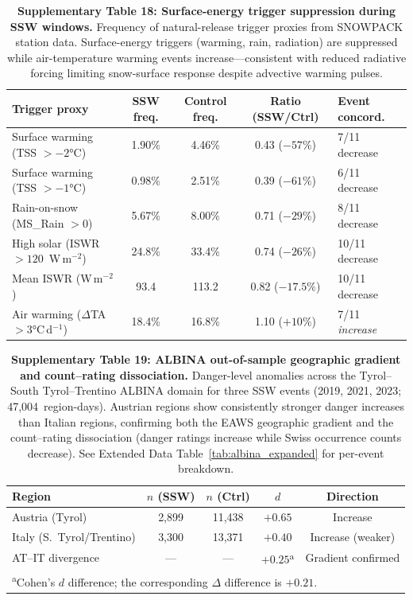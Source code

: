 \documentclass[11pt,letterpaper]{article}
\begin{document}
\begin{table}[!ht]
\centering
\caption{\textbf{Supplementary Table 18: Surface-energy trigger suppression during SSW windows.}
Frequency of natural-release trigger proxies from SNOWPACK station data. Surface-energy triggers (warming, rain, radiation) are suppressed while air-temperature warming events increase---consistent with reduced radiative forcing limiting snow-surface response despite advective warming pulses.}
\label{tab:triggers}
\small
\begin{tabular}{lcccl}
\toprule
Trigger proxy & SSW freq. & Control freq. & Ratio (SSW/Ctrl) & Event concord. \\
\midrule
Surface warming (TSS $> -2$°C) & 1.90\% & 4.46\% & 0.43 ($-57\%$) & 7/11 decrease \\
Surface warming (TSS $> -1$°C) & 0.98\% & 2.51\% & 0.39 ($-61\%$) & 6/11 decrease \\
Rain-on-snow (MS\_Rain $> 0$) & 5.67\% & 8.00\% & 0.71 ($-29\%$) & 8/11 decrease \\
High solar (ISWR $> 120$~W\,m$^{-2}$) & 24.8\% & 33.4\% & 0.74 ($-26\%$) & 10/11 decrease \\
Mean ISWR (W\,m$^{-2}$) & 93.4 & 113.2 & 0.82 ($-17.5\%$) & 10/11 decrease \\
\midrule
Air warming ($\Delta$TA $> 3$°C\,d$^{-1}$) & 18.4\% & 16.8\% & 1.10 ($+10\%$) & 7/11 \emph{increase} \\
\bottomrule
\end{tabular}
\end{table}

\begin{table}[!ht]
\centering
\caption{\textbf{Supplementary Table 19: ALBINA out-of-sample geographic gradient and count--rating dissociation.}
Danger-level anomalies across the Tyrol--South Tyrol--Trentino ALBINA domain for three SSW events (2019, 2021, 2023; 47,004~region-days). Austrian regions show consistently stronger danger increases than Italian regions, confirming both the EAWS geographic gradient and the count--rating dissociation (danger ratings increase while Swiss occurrence counts decrease). See Extended Data Table~\ref{tab:albina_expanded} for per-event breakdown.}
\label{tab:albina}
\small
\begin{tabular}{lcccc}
\toprule
Region & $n$ (SSW) & $n$ (Ctrl) & $d$ & Direction \\
\midrule
Austria (Tyrol) & 2,899 & 11,438 & $+0.65$ & Increase \\
Italy (S.\ Tyrol/Trentino) & 3,300 & 13,371 & $+0.40$ & Increase (weaker) \\
\midrule
AT--IT divergence & --- & --- & $+0.25$\textsuperscript{a} & Gradient confirmed \\
\bottomrule
\multicolumn{5}{l}{\footnotesize \textsuperscript{a}Cohen's $d$ difference; the corresponding $\Delta$ difference is $+0.21$.} \\
\end{tabular}
\end{table}
\end{document}
